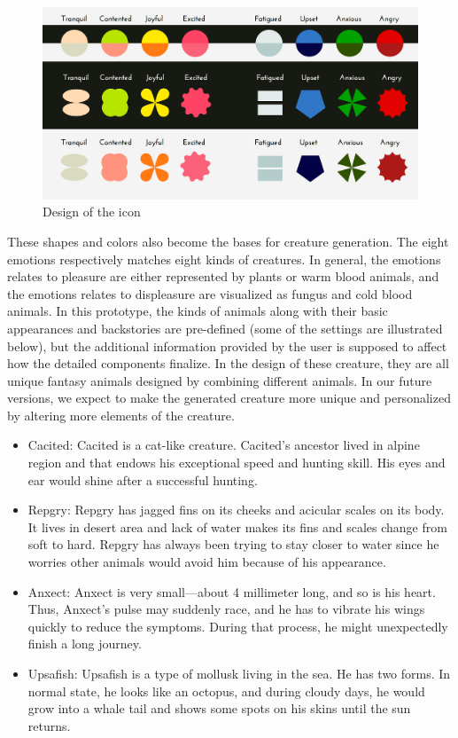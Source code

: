 \documentclass[manuscript,screen]{acmart}
\begin{document}
\begin{figure}[h]
  \centering
  \includegraphics[width=\linewidth]{Icon.png}
  \caption{Design of the icon}
  \label{Icon}
\end{figure}

These shapes and colors also become the bases for creature generation. The eight emotions respectively matches eight kinds of creatures. In general, the emotions relates to pleasure are either represented by plants or warm blood animals, and the emotions relates to displeasure are visualized as fungus and cold blood animals. In this prototype, the kinds of animals along with their basic appearances and backstories are pre-defined (some of the settings are illustrated below), but the additional information provided by the user is supposed to affect how the detailed components finalize. In the design of these creature, they are all unique fantasy animals designed by combining different animals. In our future versions, we expect to make the generated creature more unique and personalized by altering more elements of the creature.


\begin{itemize}
  \item Cacited: Cacited is a cat-like creature. Cacited’s ancestor lived in alpine region and that endows his exceptional speed and hunting skill. His eyes and ear would shine after a successful hunting.
  \item Repgry: Repgry has jagged fins on its cheeks and acicular scales on its body. It lives in desert area and lack of water makes its fins and scales change from soft to hard. Repgry has always been trying to stay closer to water since he worries other animals would avoid him because of his appearance.
  \item Anxect: Anxect is very small—about 4 millimeter long, and so is his heart. Thus, Anxect’s pulse may suddenly race, and he has to vibrate his wings quickly to reduce the symptoms. During that process, he might unexpectedly finish a long journey. 
  \item Upsafish: Upsafish is a type of mollusk living in the sea. He has two forms. In normal state, he looks like an octopus, and during cloudy days, he would grow into a whale tail  and shows some spots on his skins until the sun returns.
\end{itemize}
\end{document}
